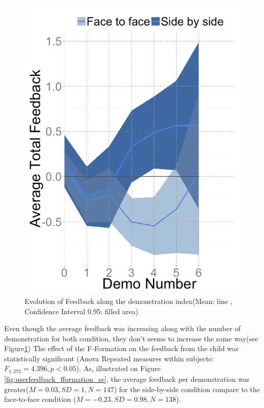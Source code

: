\documentclass[letterpaper, 10 pt, conference]{ieeeconf}  %
\begin{document}
\begin{figure}
	\centering
	\includegraphics[width=0.75\linewidth]{figures/plots/evoldemocondbis}
	\caption{Evolution of Feedback along the demonstration index(Mean: line , Confidence Interval 0.95: filled area)}
	\label{fig:uf_nb}
\end{figure}
Even though the average feedback was increasing along with the number of demonstration for both condition, they don't seems to increase the same way(see Figure\ref{fig:uf_nb})
The effect of the F-Formation on the feedback from the child was statistically significant (Anova Repeated measures within subjects: $F_{1,272}= 4.396, p<0.05$). As, illustrated on Figure \ref{fig:userfeedback_fformation_se}, the average feedback per demonstration was greater($M=0.03, SD=1, N=147$) for the side-by-side condition compare to the face-to-face condition ($M=-0.23, SD=0.98, N=138$).
\end{document}
